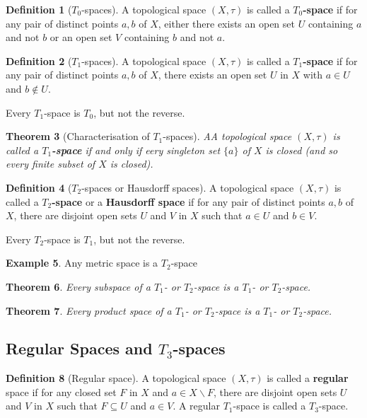 \documentclass[10pt, oneside, reqno]{amsart}
\theoremstyle{plain}%
\newtheorem{thm}{Theorem}[section]
\theoremstyle{definition}
\newtheorem{defn}[thm]{Definition}
\newtheorem{exmp}[thm]{Example}
\theoremstyle{remark}
\newcommand{\topo}{(X,\tau)}
\begin{document}
\begin{defn}[$T_0$-spaces]
    A topological space $\topo$ is called a \textbf{$T_0$-space} if for any pair of distinct points $a,b$ of $X$, either there exists an open set $U$ containing $a$ and not $b$ or an open set $V$ containing $b$ and not $a$.
\end{defn}

\begin{defn}[$T_1$-spaces]
A topological space $\topo$ is called a \textbf{$T_1$-space} if for any pair of distinct points $a,b$ of $X$, there exists an open set $U $ in $X$ with $a \in U$ and $b \notin U$.
\end{defn}

Every $T_1$-space is $T_0$, but not the reverse.

\begin{thm}[Characterisation of $T_1$-spaces]
    AA topological space $\topo$ is called a \textbf{$T_1$-space} if and only if eery singleton set $\{ a \}$ of $X$ is closed (and so every finite subset of $X$ is closed).
\end{thm}
    
\begin{defn}[$T_2$-spaces or Hausdorff spaces]
    A topological space $\topo$ is called a \textbf{$T_2$-space} or a \textbf{Hausdorff space} if for any pair of distinct points $a,b$ of $X$, there are disjoint open sets $U$ and $V$ in $X$ such that $a \in U$ and $b \in V$.
\end{defn}

Every $T_2$-space is $T_1$, but not the reverse.

\begin{exmp}
    Any metric space is a $T_2$-space
\end{exmp}
    
\begin{thm}
    Every subspace of a $T_1$- or $T_2$-space is a $T_1$- or $T_2$-space. 
\end{thm}

\begin{thm}
    Every product space of a $T_1$- or $T_2$-space is a $T_1$- or $T_2$-space. 
\end{thm}

\subsection{Regular Spaces and $T_3$-spaces} %
\label{sub:regular_spaces}

\begin{defn}[Regular space]
    A topological space $\topo$ is called a \textbf{regular} space if for any closed set $F$ in $X$ and $a \in X \backslash F$, there are disjoint open sets $U$ and $V$ in $X$ such that $F \subseteq U$ and $a \in V$.  A regular $T_1$-space is called a $T_3$-space.
\end{defn}
\end{document}
